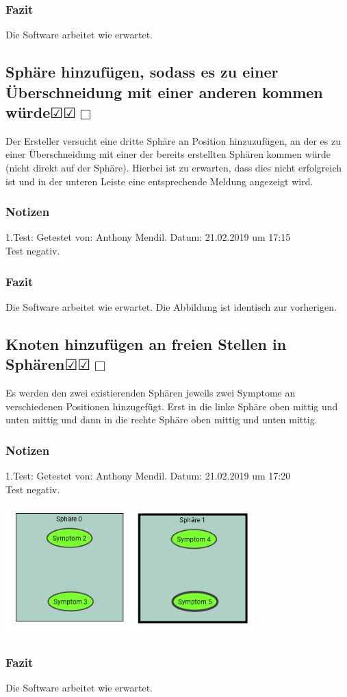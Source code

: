 \documentclass{scrartcl}
\newcommand{\subsectiont}[2]{\subsection[#1]{#1{\normalsize\normalfont #2}}}
\newcommand{\leer}{$\Box$}
\newcommand{\ok}{$\CheckedBox$}
\begin{document}
\subsubsection{Fazit}
Die Software arbeitet wie erwartet.

\subsectiont{Sphäre hinzufügen, sodass es zu einer Überschneidung mit einer anderen kommen würde}{\dotfill\ok\ok\leer}
Der Ersteller versucht eine dritte Sphäre an Position hinzuzufügen, an der es zu einer Überschneidung mit einer der bereits erstellten Sphären kommen würde (nicht direkt auf der Sphäre). Hierbei ist zu erwarten, dass dies nicht erfolgreich ist und in der unteren Leiste eine entsprechende Meldung angezeigt wird. 
\subsubsection{Notizen}
1.Test: Getestet von: Anthony Mendil. Datum: 21.02.2019 um 17:15 \\
Test negativ.
\subsubsection{Fazit}
Die Software arbeitet wie erwartet. Die Abbildung ist identisch zur vorherigen.

\subsectiont{Knoten hinzufügen an freien Stellen in Sphären}{\dotfill\ok\ok\leer}
Es werden den zwei existierenden Sphären jeweils zwei Symptome an verschiedenen Positionen hinzugefügt. Erst in die linke Sphäre oben mittig und unten mittig und dann in die rechte Sphäre oben mittig und unten mittig.  
\subsubsection{Notizen}
1.Test: Getestet von: Anthony Mendil. Datum: 21.02.2019 um 17:20 \\
Test negativ.
\begin{center}
\includegraphics[height=5cm]{1_3.PNG}
\end{center}
\subsubsection{Fazit}
Die Software arbeitet wie erwartet.
\end{document}
